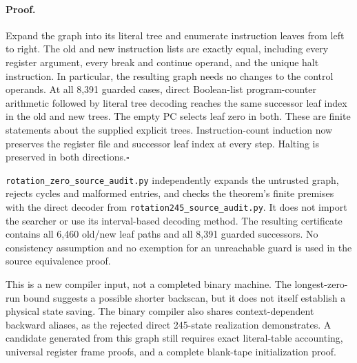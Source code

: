 \paragraph{Proof.}
Expand the graph into its literal tree and enumerate instruction leaves
from left to right.  The old and new instruction lists are exactly equal,
including every register argument, every break and continue operand, and
the unique halt instruction.  In particular, the resulting graph needs
no changes to the control operands.  At all 8,391 guarded cases, direct
Boolean-list program-counter arithmetic followed by literal tree
decoding reaches the same successor leaf index in the old and new trees.
The empty PC selects leaf zero in both.  These are finite statements
about the supplied explicit trees.  Instruction-count induction now
preserves the register file and successor leaf index at every step.
Halting is preserved in both directions.\hfill$\square$

\texttt{rotation\_zero\_source\_audit.py} independently expands the
untrusted graph, rejects cycles and malformed entries, and checks the
theorem's finite premises with the direct decoder from
\texttt{rotation245\_source\_audit.py}.  It does not import the searcher
or use its interval-based decoding method.  The resulting certificate
contains all 6,460 old/new leaf paths and all 8,391 guarded successors.
No consistency assumption and no exemption for an unreachable guard is
used in the source equivalence proof.

This is a new compiler input, not a completed binary machine.  The
longest-zero-run bound suggests a possible shorter backscan, but it does
not itself establish a physical state saving.  The binary compiler also
shares context-dependent backward aliases, as the rejected direct
245-state realization demonstrates.  A candidate generated from this
graph still requires exact literal-table accounting, universal register
frame proofs, and a complete blank-tape initialization proof.
